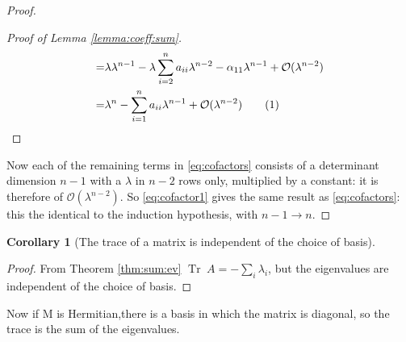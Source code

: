 \documentclass[]{article}
\newcommand\numberthis{\addtocounter{equation}{1}\tag{\theequation}}
\newtheorem{cor}[thm]{Corollary}
\DeclareMathOperator{\Tr}{Tr \;}
\begin{document}
\begin{proof}
\begin{proof}[Proof of Lemma \ref{lemma:coeff:sum}]
\begin{align*}
			=& \lambda \lambda^{n-1} - \lambda \sum_{i=2}^{n}a_{ii}\lambda^{n-2} - \alpha_{11}\lambda^{n-1} + \mathcal{O}(\lambda^{n-2})\\
			=& \lambda^n - \sum_{i=1}^{n}a_{ii}\lambda^{n-1}+ \mathcal{O}(\lambda^{n-2}) \numberthis \label{eq:cofactor1}
		\end{align*}
	\end{proof}
	Now each of the remaining terms in \eqref{eq:cofactors} consists of a determinant dimension $n-1$ with a $\lambda$ in $n-2$ rows only, multiplied by a constant: it is therefore of $\mathcal{O}(\lambda^{n-2})$. So \eqref{eq:cofactor1} gives the same result as \eqref{eq:cofactors}: this the identical to the induction hypothesis, with $n-1\rightarrow n$.

\end{proof}

\begin{cor}[The trace of a matrix is independent of the choice of basis]\end{cor}
\begin{proof}
	From Theorem \ref{thm:sum:ev} $\Tr A = - \sum_i \lambda_i$, but the eigenvalues are independent of the choice of basis.
\end{proof}

Now if M is Hermitian,there is a basis in which the matrix is diagonal, so the trace is the sum of the eigenvalues.
\end{document}
